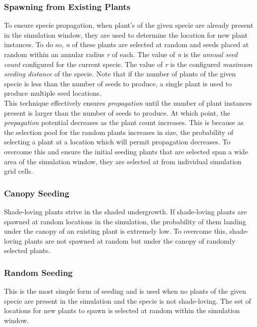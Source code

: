 \subsubsection{Spawning from Existing Plants}

To ensure specie propagation, when plant's of the given specie are already present in the simulation window, they are used to determine the location for new plant instances. To do so, \textit{n} of these plants are selected at random and seeds placed at random within an annular radius \textit{r} of each. The value of \textit{n} is the \textit{annual seed count} configured for the current specie. The value of \textit{r} is the configured \textit{maximum seeding distance} of the specie. Note that if the number of plants of the given specie is less than the number of seeds to produce, a single plant is used to produce multiple seed locations. \\

This technique effectively ensures \textit{propagation} until the number of plant instances present is larger than the number of seeds to produce. At which point, the \textit{propagation} potential decreases as the plant count increases. This is because as the selection pool for the random plants increases in size, the probability of selecting a plant at a location which will permit propagation decreases. To overcome this and ensure the initial seeding plants that are selected span a wide area of the simulation window, they are selected at from individual simulation grid cells.\\

\subsubsection{Canopy Seeding}

Shade-loving plants strive in the shaded undergrowth. If shade-loving plants are spawned at random locations in the simulation, the probability of them landing under the canopy of an existing plant is extremely low. To overcome this, shade-loving plants are not spawned at random but under the canopy of randomly selected plants.

\subsubsection{Random Seeding}

This is the most simple form of seeding and is used when no plants of the given specie are present in the simulation and the specie is not shade-loving. The set of locations for new plants to spawn is selected at random within the simulation window.

